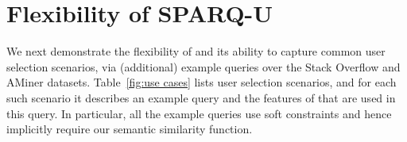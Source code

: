 \section{Flexibility of SPARQ-U}
\label{Expresivness sparqu}

   
   




We next demonstrate the flexibility of \qlang{} and its ability to capture common user selection scenarios, via (additional) example queries over the Stack Overflow and AMiner datasets.
Table~\ref{fig:use cases} lists user selection scenarios, and for each such scenario it describes an example query and the features of \qlang{} that are used in this query. In particular, all the example queries use soft constraints and hence implicitly require our semantic similarity function.






